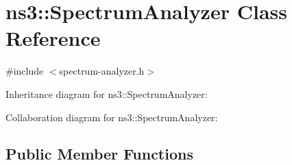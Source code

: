 \hypertarget{classns3_1_1SpectrumAnalyzer}{}\section{ns3\+:\+:Spectrum\+Analyzer Class Reference}
\label{classns3_1_1SpectrumAnalyzer}


{\ttfamily \#include $<$spectrum-\/analyzer.\+h$>$}



Inheritance diagram for ns3\+:\+:Spectrum\+Analyzer\+:


Collaboration diagram for ns3\+:\+:Spectrum\+Analyzer\+:
\subsection*{Public Member Functions}
